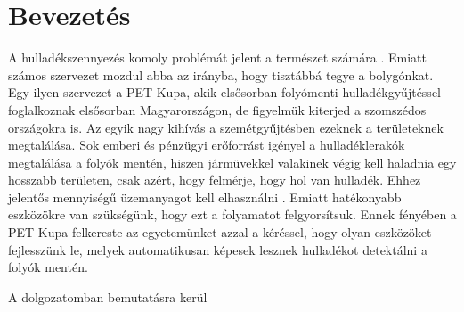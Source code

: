 \chapter{Bevezetés}
\label{ch:intro}

A hulladékszennyezés komoly problémát jelent a természet számára \cite{kibria2023PlasticWaste}. Emiatt számos szervezet mozdul abba az irányba, hogy tisztábbá tegye a bolygónkat. Egy ilyen szervezet a PET Kupa, akik elsősorban folyómenti hulladékgyűjtéssel foglalkoznak elsősorban Magyarországon, de figyelmük kiterjed a szomszédos országokra is. Az egyik nagy kihívás a szemétgyűjtésben ezeknek a területeknek megtalálása. Sok emberi és pénzügyi erőforrást igényel a hulladéklerakók megtalálása a folyók mentén, hiszen jármüvekkel valakinek végig kell haladnia egy hosszabb területen, csak azért, hogy felmérje, hogy hol van hulladék. Ehhez jelentős mennyiségű üzemanyagot kell elhasználni . Emiatt hatékonyabb eszközökre van szükségünk, hogy ezt a folyamatot felgyorsítsuk. Ennek fényében a PET Kupa felkereste az egyetemünket azzal a kéréssel, hogy olyan eszközöket fejlesszünk le, melyek automatikusan képesek lesznek hulladékot detektálni a folyók mentén.

A dolgozatomban bemutatásra kerül